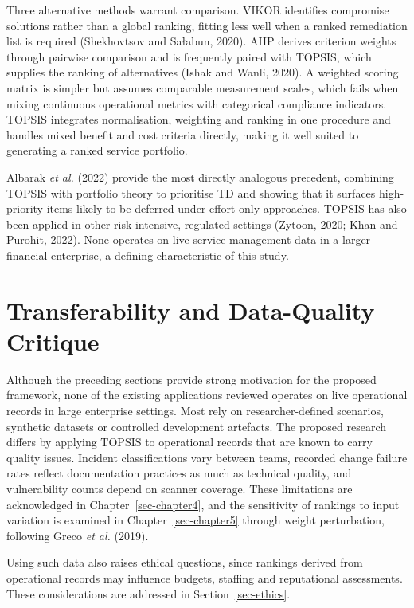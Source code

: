 \documentclass[
  12pt,
  letterpaper,
  12pt,
  oneside,
  english,
  onehalfspacing,
  headsepline]{MastersDoctoralThesis}
\begin{document}
Three alternative methods warrant comparison. VIKOR identifies
compromise solutions rather than a global ranking, fitting less well
when a ranked remediation list is required (Shekhovtsov and Sałabun,
2020). AHP derives criterion weights through pairwise comparison and is
frequently paired with TOPSIS, which supplies the ranking of
alternatives (Ishak and Wanli, 2020). A weighted scoring matrix is
simpler but assumes comparable measurement scales, which fails when
mixing continuous operational metrics with categorical compliance
indicators. TOPSIS integrates normalisation, weighting and ranking in
one procedure and handles mixed benefit and cost criteria directly,
making it well suited to generating a ranked service portfolio.

Albarak \emph{et al.} (2022) provide the most directly analogous
precedent, combining TOPSIS with portfolio theory to prioritise TD and
showing that it surfaces high-priority items likely to be deferred under
effort-only approaches. TOPSIS has also been applied in other
risk-intensive, regulated settings (Zytoon, 2020; Khan and Purohit,
2022). None operates on live service management data in a larger
financial enterprise, a defining characteristic of this study.

\section{Transferability and Data-Quality Critique}\label{sec-transfer}

Although the preceding sections provide strong motivation for the
proposed framework, none of the existing applications reviewed operates
on live operational records in large enterprise settings. Most rely on
researcher-defined scenarios, synthetic datasets or controlled
development artefacts. The proposed research differs by applying TOPSIS
to operational records that are known to carry quality issues. Incident
classifications vary between teams, recorded change failure rates
reflect documentation practices as much as technical quality, and
vulnerability counts depend on scanner coverage. These limitations are
acknowledged in Chapter~\ref{sec-chapter4}, and the sensitivity of
rankings to input variation is examined in Chapter~\ref{sec-chapter5}
through weight perturbation, following Greco \emph{et al.} (2019).

Using such data also raises ethical questions, since rankings derived
from operational records may influence budgets, staffing and
reputational assessments. These considerations are addressed in
Section~\ref{sec-ethics}.
\end{document}
